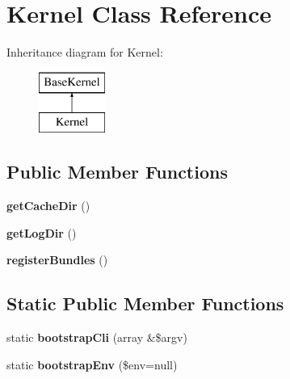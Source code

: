 \hypertarget{class_app_1_1_kernel}{}\section{Kernel Class Reference}
\label{class_app_1_1_kernel}
Inheritance diagram for Kernel\+:\begin{figure}[H]
\begin{center}
\leavevmode
\includegraphics[height=2.000000cm]{class_app_1_1_kernel}
\end{center}
\end{figure}
\subsection*{Public Member Functions}
\begin{DoxyCompactItemize}
\item 
\mbox{\label{class_app_1_1_kernel_af1aaf85d6756805f7dabac5feb2fa952}} 
{\bfseries get\+Cache\+Dir} ()
\item 
\mbox{\label{class_app_1_1_kernel_a446ab1862b5838c87c0b692c2268b7d5}} 
{\bfseries get\+Log\+Dir} ()
\item 
\mbox{\label{class_app_1_1_kernel_a8dd304e2eccfbe88dd648389c7d4f5eb}} 
{\bfseries register\+Bundles} ()
\end{DoxyCompactItemize}
\subsection*{Static Public Member Functions}
\begin{DoxyCompactItemize}
\item 
\mbox{\label{class_app_1_1_kernel_ade495b387dcc118e79503f10abf316a4}} 
static {\bfseries bootstrap\+Cli} (array \&\$argv)
\item 
\mbox{\label{class_app_1_1_kernel_ac5b0ee3e92bf0200ce9faecabc5a1f57}} 
static {\bfseries bootstrap\+Env} (\$env=null)
\end{DoxyCompactItemize}
